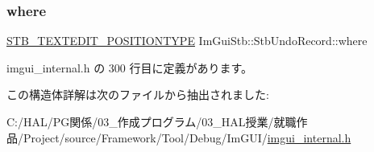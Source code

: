 \subsubsection{\texorpdfstring{where}{where}}
{\footnotesize\ttfamily \mbox{\hyperlink{stb__textedit_8h_a5d0c1b8751b6517e3d817f2a025ed654}{S\+T\+B\+\_\+\+T\+E\+X\+T\+E\+D\+I\+T\+\_\+\+P\+O\+S\+I\+T\+I\+O\+N\+T\+Y\+PE}} Im\+Gui\+Stb\+::\+Stb\+Undo\+Record\+::where}



 imgui\+\_\+internal.\+h の 300 行目に定義があります。



この構造体詳解は次のファイルから抽出されました\+:\begin{DoxyCompactItemize}
\item 
C\+:/\+H\+A\+L/\+P\+G関係/03\+\_\+作成プログラム/03\+\_\+\+H\+A\+L授業/就職作品/\+Project/source/\+Framework/\+Tool/\+Debug/\+Im\+G\+U\+I/\mbox{\hyperlink{imgui__internal_8h}{imgui\+\_\+internal.\+h}}\end{DoxyCompactItemize}
